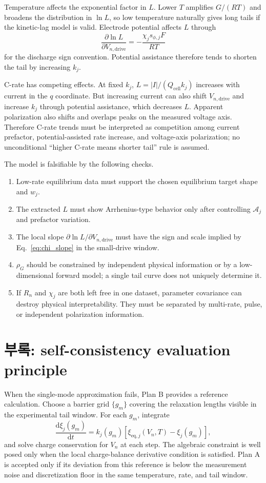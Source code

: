 \documentclass[11pt,a4paper]{article}
\newcommand{\dd}{\mathrm{d}}
\newcommand{\eq}{\mathrm{eq}}
\newcommand{\drive}{\mathrm{drive}}
\newcommand{\cell}{\mathrm{cell}}
\begin{document}
Temperature affects the exponential factor in $L$. Lower $T$ amplifies $G/(RT)$ and broadens the distribution in $\ln L$, so low temperature
naturally gives long tails if the kinetic-lag model is valid. Electrode potential affects $L$ through
\begin{equation}
\frac{\partial\ln L}{\partial V_{n,\drive}}=-\frac{\chi_js_{\phi,j}F}{RT}
\end{equation}
for the discharge sign convention. Potential assistance therefore tends to shorten the tail by increasing $k_j$.

C-rate has competing effects. At fixed $k_j$, $L=|I|/(Q_{\cell}k_j)$ increases with current in the $q$ coordinate. But increasing current can
also shift $V_{n,\drive}$ and increase $k_j$ through potential assistance, which decreases $L$. Apparent polarization also shifts and overlaps
peaks on the measured voltage axis. Therefore C-rate trends must be interpreted as competition among current prefactor, potential-assisted
rate increase, and voltage-axis polarization; no unconditional ``higher C-rate means shorter tail'' rule is assumed.

The model is falsifiable by the following checks.
\begin{enumerate}[label=\textbf{N\arabic*.},leftmargin=2.4em]
\item Low-rate equilibrium data must support the chosen equilibrium target shape and $w_j$.
\item The extracted $L$ must show Arrhenius-type behavior only after controlling $\mathcal A_j$ and prefactor variation.
\item The local slope $\partial\ln L/\partial V_{n,\drive}$ must have the sign and scale implied by Eq.~\eqref{eq:chi_slope} in the small-drive window.
\item $\rho_G$ should be constrained by independent physical information or by a low-dimensional forward model; a single tail curve does not uniquely determine it.
\item If $R_n$ and $\chi_j$ are both left free in one dataset, parameter covariance can destroy physical interpretability. They must be separated by multi-rate, pulse, or independent polarization information.
\end{enumerate}

\section{부록: self-consistency evaluation principle}\label{sec:ch1_numeric}
When the single-mode approximation fails, Plan B provides a reference calculation. Choose a barrier grid $\{g_m\}$ covering the relaxation
lengths visible in the experimental tail window. For each $g_m$, integrate
\begin{equation}
\frac{\dd\xi_j(g_m)}{\dd t}=k_j(g_m)[\xi_{\eq,j}(V_n,T)-\xi_j(g_m)],
\end{equation}
and solve charge conservation for $V_n$ at each step. The algebraic constraint is well posed only when the local charge-balance derivative
condition is satisfied. Plan A is accepted only if its deviation from this reference is below the measurement noise and discretization floor in the
same temperature, rate, and tail window.
\end{document}
